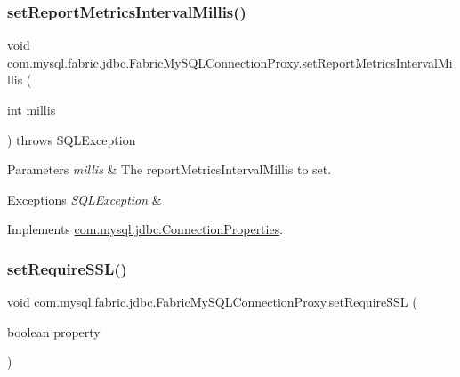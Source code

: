 \subsubsection{\texorpdfstring{set\+Report\+Metrics\+Interval\+Millis()}{setReportMetricsIntervalMillis()}}
{\footnotesize\ttfamily void com.\+mysql.\+fabric.\+jdbc.\+Fabric\+My\+S\+Q\+L\+Connection\+Proxy.\+set\+Report\+Metrics\+Interval\+Millis (\begin{DoxyParamCaption}\item[{int}]{millis }\end{DoxyParamCaption}) throws S\+Q\+L\+Exception}


\begin{DoxyParams}{Parameters}
{\em millis} & The report\+Metrics\+Interval\+Millis to set. \\
\hline
\end{DoxyParams}

\begin{DoxyExceptions}{Exceptions}
{\em S\+Q\+L\+Exception} & \\
\hline
\end{DoxyExceptions}


Implements \mbox{\hyperlink{interfacecom_1_1mysql_1_1jdbc_1_1_connection_properties_a98e28b386c63acdab88d1fdc0531d8ce}{com.\+mysql.\+jdbc.\+Connection\+Properties}}.

\mbox{\label{classcom_1_1mysql_1_1fabric_1_1jdbc_1_1_fabric_my_s_q_l_connection_proxy_abf68799a355c2508cab5bba93f28875b}} 
\subsubsection{\texorpdfstring{set\+Require\+S\+S\+L()}{setRequireSSL()}}
{\footnotesize\ttfamily void com.\+mysql.\+fabric.\+jdbc.\+Fabric\+My\+S\+Q\+L\+Connection\+Proxy.\+set\+Require\+S\+SL (\begin{DoxyParamCaption}\item[{boolean}]{property }\end{DoxyParamCaption})}


